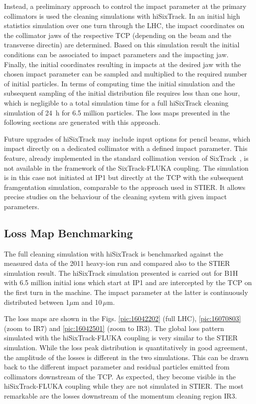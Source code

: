 Instead, a preliminary approach to control the impact parameter at the primary collimators is used the cleaning simulations with hiSixTrack. In an initial high statistics simulation over one turn through the LHC, the impact coordinates on the collimator jaws of the respective TCP (depending on the beam and the transverse directin) are determined. Based on this simulation result the initial conditions can be associated to impact parameters and the impacting jaw. Finally, the initial coordinates resulting in impacts at the desired jaw with the chosen impact parameter can be sampled and multiplied to the required number of initial particles. In terms of computing time the initial simulation and the subsequent sampling of the initial distribution file requires less than one hour, which is negligible to a total simulation time for a full hiSixTrack cleaning simulation of 24~h for 6.5 million particles. The loss maps presented in the following sections are generated with this approach.

Future upgrades of hiSixTrack may include input options for pencil beams, which impact directly on a dedicated collimator with a defined impact parameter. This feature, already implemented in the standard collimation version of SixTrack~\cite{bruce_cwg:166}, is not available in the framework of the SixTrack-FLUKA coupling. The simulation is in this case not initiated at IP1 but directly at the TCP with the subsequent framgentation simulation, comparable to the approach used in STIER. It allows precise studies on the behaviour of the cleaning system with given impact parameters.




\subsection{Loss Map Benchmarking} \label{lm:benchmark}


The full cleaning simulation with hiSixTrack is benchmarked against the measured data of the 2011 heavy-ion run and compared also to the STIER simulation result. The hiSixTrack simulation presented is carried out for B1H with 6.5 million initial \lead ions which start at IP1 and are intercepted by the TCP on the first turn in the machine. The impact parameter at the latter is continuously distributed between 1$\mu$m and 10$\,\mu$m. 

The loss maps are shown in the Figs. \ref{pic:16042202} (full LHC), \ref{pic:16070803} (zoom to IR7) and \ref{pic:16042501} (zoom to IR3). The global loss pattern simulated with the hiSixTrack-FLUKA coupling is very similar to the STIER simulation. While the loss peak distribution is quantitatively in good agreement, the amplitude of the losses is different in the two simulations. This can be drawn back to the different impact parameter and residual particles emitted from collimators downstream of the TCP. As expected, they become visible in the hiSixTrack-FLUKA coupling while they are not simulated in STIER. The most remarkable are the losses downstream of the momentum cleaning region IR3. 

